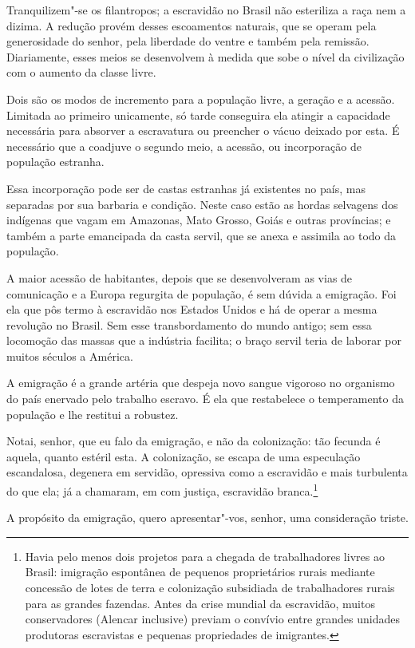  Tranquilizem"-se os filantropos; a escravidão no Brasil não esteriliza \label{filantropo}
a raça nem a dizima. A redução provém desses escoamentos naturais, que
se operam pela generosidade do senhor, pela liberdade do ventre e
também pela remissão. Diariamente, esses meios se desenvolvem à medida
que sobe o nível da civilização com o aumento da classe livre.

 Dois são os modos de incremento para a população livre, a geração e a
acessão. Limitada ao primeiro unicamente, só tarde conseguira ela
atingir a capacidade necessária para absorver a escravatura ou
preencher o vácuo deixado por esta. É necessário que a coadjuve o
segundo meio, a acessão, ou incorporação de população estranha.

 Essa incorporação pode ser de castas estranhas já existentes no país,
mas separadas por sua barbaria e condição. Neste caso estão as hordas
selvagens dos indígenas que vagam em Amazonas, Mato Grosso, Goiás e
outras províncias; e também a parte emancipada da casta servil, que se
anexa e assimila ao todo da população.

 A maior acessão de habitantes, depois que se desenvolveram as vias de
comunicação e a Europa regurgita de população, é sem dúvida a
emigração. Foi ela que pôs termo à escravidão nos Estados Unidos e há
de operar a mesma revolução no Brasil. Sem esse transbordamento do
mundo antigo; sem essa locomoção das massas que a indústria facilita; o
braço servil teria de laborar por muitos séculos a América.

 A emigração é a grande artéria que despeja novo sangue vigoroso no
organismo do país enervado pelo trabalho escravo. É ela que restabelece
o temperamento da população e lhe restitui a robustez. 

 Notai, senhor, que eu falo da emigração, e não da colonização: tão
fecunda é aquela, quanto estéril esta. A colonização, se escapa de uma
especulação escandalosa, degenera em servidão, opressiva como a
escravidão e mais turbulenta do que ela; já a chamaram, em com justiça,
escravidão branca.\footnote{ Havia pelo menos dois projetos para a chegada de trabalhadores 
livres ao Brasil: imigração espontânea de pequenos proprietários rurais mediante concessão 
de lotes de terra e colonização subsidiada de trabalhadores rurais para as grandes fazendas. 
Antes da crise mundial da escravidão, muitos conservadores (Alencar inclusive) previam o 
convívio entre grandes unidades produtoras escravistas e pequenas propriedades de imigrantes.}

 A propósito da emigração, quero apresentar"-vos, senhor, uma
consideração triste. 

